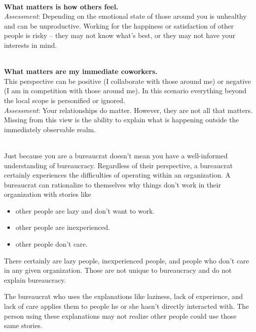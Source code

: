 \ \\ 
\textbf{What matters is how others feel.}\\
\textit{Assessment}: Depending on the emotional state of those around you is unhealthy and can be unproductive. Working for the happiness or satisfaction of other people is risky -- they may not know what's best, or they may not have your interests in mind.

\ \\
\textbf{What matters are my immediate coworkers.}\\
This perspective can be positive (I collaborate with those around me) or negative (I am in competition with those around me).
In this scenario everything beyond the local scope is personified or ignored.  \\
\textit{Assessment}: Your relationships do matter. However, they are not all that matters. Missing from this view is the ability to explain what is happening outside the immediately observable realm. 

\ \\

Just because you are a bureaucrat doesn't mean you have a well-informed understanding of bureaucracy. Regardless of their perspective, a bureaucrat certainly experiences the difficulties of operating within an organization. A bureaucrat can rationalize to themselves why things don't work in their organization with stories like
\begin{itemize}
\item other people are lazy and don't want to work.
\item other people are inexperienced.
\item other people don't care.
\end{itemize}
There certainly are lazy people, inexperienced people, and people who don't care in any given organization. Those are not unique to bureaucracy and do not explain bureaucracy.

The bureaucrat who uses the explanations like laziness, lack of experience, and lack of care applies them to people he or she hasn't directly interacted with.  The person using these explanations may not realize other people could use those same stories. 